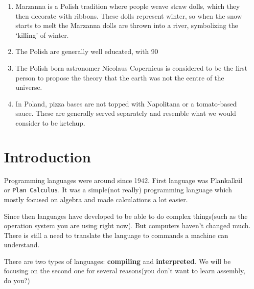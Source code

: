 \documentclass{42-en}
\begin{document}
\begin{enumerate}
                \item Marzanna is a Polish tradition where people weave straw dolls, which they then decorate with ribbons. These dolls represent winter, so when the snow starts to melt the Marzanna dolls are thrown into a river, symbolizing the ‘killing’ of winter.
                \item The Polish are generally well educated, with 90%
                \item The Polish born astronomer Nicolaus Copernicus is considered to be the first person to propose the theory that the earth was not the centre of the universe.
                \item In Poland, pizza bases are not topped with Napolitana or a tomato-based sauce. These are generally served separately and resemble what we would consider to be ketchup.\\
            \end{enumerate}


\chapter{Introduction}

    Programming languages were around since 1942. First language was Plankalkül
    or  \texttt{Plan Calculus}. It was a simple(not really) programming language
    which mostly focused on algebra and made calculations a lot easier.
    
    Since then languages have developed to be able to do complex things(such as
    the operation system you are using right now). But computers haven't changed much.
    There is still a need to translate the language to commands a machine can understand.
    
    There are two types of languages: \textbf{compiling} and \textbf{interpreted}.
    We will be focusing on the second one for several reasons(you don't want to learn
    assembly, do you?)
\end{document}

